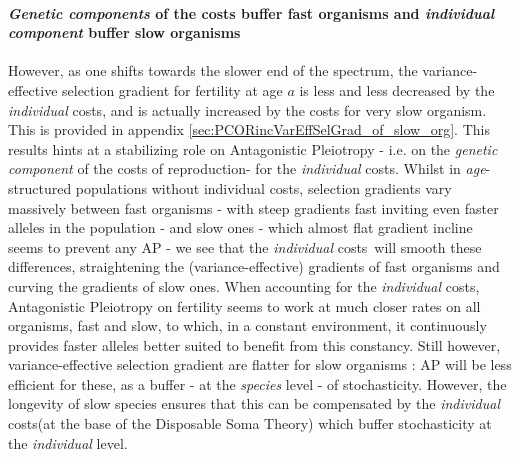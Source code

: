 \documentclass[10pt,a4paper]{article}
\newcommand{\lam}{$\lambda$}
\newcommand{\PCoR}{\emph{individual} costs}
\newcommand{\GCoR}{\emph{genetic} costs}
\newcommand{\vLRO}{$\sigma_{\mathrm{\mathcal{LRS}}}^2$}
\begin{document}
\paragraph{\emph{Genetic components} of the costs buffer fast organisms and \emph{individual component} buffer slow organisms }
However, as one shifts towards the slower end of the spectrum, the variance-effective selection gradient for fertility at age $a$ is less and less decreased by the \PCoR, and is actually increased by the costs for very slow organism. This is provided in appendix \ref{sec:PCORincVarEffSelGrad_of_slow_org}.
This results hints at a stabilizing role on Antagonistic Pleiotropy - i.e. on the \emph{genetic component} of the costs of reproduction- for the \PCoR. Whilst in \emph{age}-structured populations without individual costs, selection gradients  vary massively between fast organisms - with steep gradients fast inviting even faster alleles in the population - and slow ones - which almost flat gradient incline seems to prevent any AP - we see that the \PCoR\ will smooth these differences, straightening the (variance-effective) gradients of fast organisms and curving the gradients of slow ones. When accounting for the \PCoR, Antagonistic Pleiotropy on fertility seems to work at much closer rates on all organisms, fast and slow, to which, in a constant environment, it continuously provides faster alleles better suited to benefit from this constancy. Still however, variance-effective selection gradient are flatter for slow organisms : AP will be less efficient for these, as a buffer - at the \emph{species} level - of stochasticity. However, the longevity of slow species ensures that this can be compensated by the \PCoR (at the base of the Disposable Soma Theory) which buffer stochasticity at the \emph{individual} level.

 
 
\end{document}
